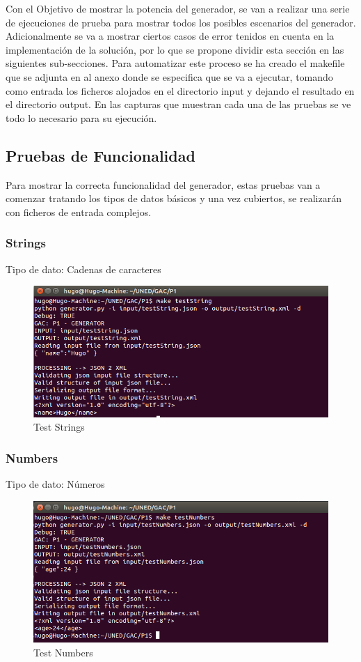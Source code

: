 \documentclass[a4paper,11pt]{book}
\begin{document}
Con el Objetivo de mostrar la potencia del generador, se van a realizar una serie de ejecuciones de prueba para mostrar todos los posibles escenarios del generador. Adicionalmente se va a mostrar ciertos casos de error tenidos en cuenta en la implementación de la solución, por lo que se propone dividir esta sección en las siguientes sub-secciones. Para automatizar este proceso se ha creado el makefile que se adjunta en al anexo donde se especifica que se va a ejecutar, tomando como entrada los ficheros alojados en el directorio input y dejando el resultado en el directorio output. En las capturas que muestran cada una de las pruebas se ve todo lo necesario para su ejecución.  

\subsection{Pruebas de Funcionalidad}
Para mostrar la correcta funcionalidad del generador, estas pruebas van a comenzar tratando los tipos de datos básicos y una vez cubiertos, se realizarán con ficheros de entrada complejos. 

\subsubsection{Strings}
Tipo de dato: Cadenas de caracteres

\begin{figure}[H]  
\centering 
\includegraphics[scale=0.35]{imagenes/testString.png}
\caption{ Test Strings  }  
\end{figure} 

\subsubsection{Numbers}
Tipo de dato: Números

\begin{figure}[H]  
\centering 
\includegraphics[scale=0.35]{imagenes/testNumbers.png}
\caption{ Test Numbers  }  
\end{figure} 
\end{document}
